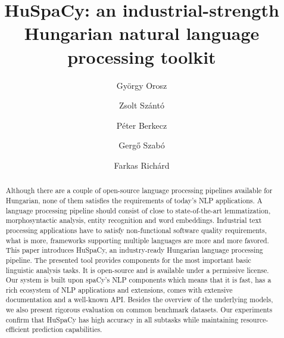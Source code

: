 \documentclass{llncs}
\newcommand{\huspacy}{HuSpaCy}
\begin{document}
\pagestyle{myheadings}
\def\leftmark{{\rm XVIII. Magyar Sz\'am\'\i t\'og\'epes Nyelv\'eszeti Konferencia}}
\def\rightmark{{\rm Szeged, 2022. január 27-28.}}


\title{\huspacy: an industrial-strength Hungarian natural language processing toolkit}

\author{György Orosz \and
    Zsolt Szántó \and \break
    Péter Berkecz \and
    Gergő Szabó \and
    Farkas Richárd\\
    \break
    \break
    \break
}

\maketitle

\begin{abstract}
Although there are a couple of open-source language processing pipelines available for Hungarian, none of them satisfies the requirements of today’s NLP applications. A language processing pipeline should consist of close to state-of-the-art lemmatization, morphosyntactic analysis, entity recognition and word embeddings. 
Industrial text processing applications have to satisfy non-functional software quality requirements, what is more, frameworks supporting multiple languages are more and more favored.
This paper introduces \huspacy, an industry-ready Hungarian language processing pipeline. The presented tool provides components for the most important basic linguistic analysis tasks. It is open-source and is available under a permissive license. Our system is built upon spaCy’s NLP components which means that it is fast, has a rich ecosystem of NLP applications and extensions, comes with extensive documentation and a well-known API. Besides the overview of the underlying models, we also present rigorous evaluation on common benchmark datasets. Our experiments confirm that HuSpaCy has high accuracy in all subtasks while maintaining resource-efficient prediction capabilities. 
\end{abstract}
\end{document}
